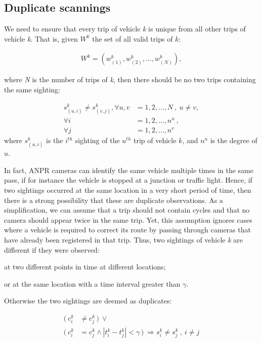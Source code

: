 \subsection{Duplicate scannings}\label{s.duplicates}

We need to ensure that every trip of vehicle \emph{k} is unique from all other trips of vehicle \emph{k}. That is, given $W^k$ the set of all valid trips of $k$:

\begin{align}
W^{k} = \left( w^{k}_{(1)}, w^{k}_{(2)}, \ldots, w^{k}_{(N)} \right) \label{e.trip.history},
\end{align}

where \emph{N} is the number of trips of \emph{k}, then there should be no two trips containing the same sighting:

\vspace{-0.5cm}
\begin{align}
s^{k}_{(u,i)} \neq s^{k}_{(v,j)}, \forall u,v &= 1, 2, \ldots, N \ , \ u \neq v,  \label{e.trip.history.constraint} \\
\forall i &= 1, 2, \ldots, n^u \ , \\
\forall j &= 1, 2, \ldots, n^v \  \nonumber
\end{align}
where $s_{(u,i)}^k$ is the $i^{th}$ sighting of the $u^{th}$ trip of vehicle $k$, and $n^u$ is the degree of $u$.

In fact, ANPR cameras can identify the same vehicle multiple times in the same pass, if for instance the vehicle is stopped at a junction or traffic light. Hence, if two sightings occurred at the same location in a very short period of time, then there is a strong possibility that these are duplicate observations. As a simplification, we can assume that a trip should not contain cycles and that no camera should appear twice in the same trip. Yet, this assumption ignores cases where a vehicle is required to correct its route by passing through cameras that have already been registered in that trip. Thus, two sightings of vehicle \emph{k} are different if they were observed:
\begin{enumerate*}[label=(\roman*)]
  \item at two different points in time at different locations;
  \item or at the same location with a time interval greater than $\gamma$.
\end{enumerate*}
Otherwise the two sightings are deemed as duplicates:

\vspace{-0.5cm}
\begin{align} \label{e.sighting.different.2}
 (\ c^{k}_{i} &\ne c^{k}_{j} \, )\ \vee \\
 (\ c^{k}_{i} &= c^{k}_{j} \wedge |t^{k}_{i} - t^{k}_{j}| < \gamma \, )\ \Rightarrow s^{k}_{i} \ne s^{k}_{j}  \ , \ i \ne j \nonumber
\end{align}

